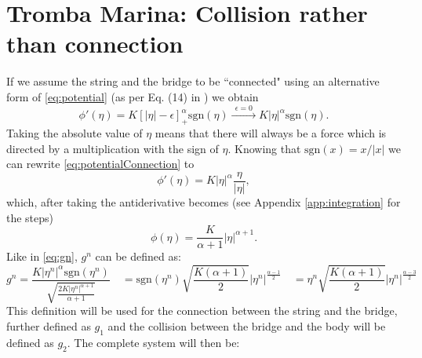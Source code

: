 \documentclass{article}
\begin{document}
\section{Tromba Marina: Collision rather than connection}
If we assume the string and the bridge to be ``connected" using an alternative form of \eqref{eq:potential} (as per Eq. (14) in \cite{Bilbao2019}) we obtain
\begin{equation}\label{eq:potentialConnection}
    \phi'(\eta) = K[|\eta| - \epsilon]_+^\alpha\text{sgn}(\eta) \xrightarrow{\ \ \epsilon = 0\ \ } K|\eta|^\alpha\text{sgn}(\eta).
\end{equation}
Taking the absolute value of $\eta$ means that there will always be a force which is directed by a multiplication with the sign of $\eta$. Knowing that $\text{sgn}(x) = x/|x|$ we can rewrite \eqref{eq:potentialConnection} to
\begin{equation}
    \phi'(\eta)=K|\eta|^\alpha\frac{\eta}{|\eta|},
\end{equation}
which, after taking the antiderivative becomes (see Appendix \ref{app:integration} for the steps)
\begin{equation}
    \phi(\eta)= \frac{K}{\alpha+1}|\eta|^{\alpha+1}.
\end{equation}
Like in \ref{eq:gn}, $g^n$ can be defined as:
\begin{equation}
    g^n = \frac{K|\eta^n|^\alpha \text{sgn}(\eta^n)}{\sqrt{\frac{2K|\eta^n|^{\alpha+1}}{\alpha+1}}}\quad= \text{sgn}(\eta^n)\sqrt{\frac{K(\alpha+1)}{2}}|\eta^n|^{\frac{\alpha-1}{2}}\quad= \eta^n\sqrt{\frac{K(\alpha+1)}{2}}|\eta^n|^{\frac{\alpha-3}{2}}
\end{equation}
This definition will be used for the connection between the string and the bridge, further defined as $g_1$ and the collision between the bridge and the body will be defined as $g_2$. The complete system will then be:
\end{document}
